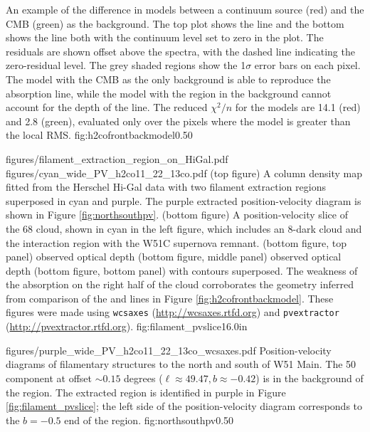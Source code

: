 {An example of the difference in models between a continuum source (red) and
the CMB (green) as the background.  The top plot shows the \oneone line and the
bottom shows the \twotwo line both with the continuum level set to zero in the
plot.  The residuals are shown
offset above the spectra, with the dashed line indicating the zero-residual
level.  The grey shaded regions show the 1$\sigma$ error bars on each pixel.
The model with the CMB as the only
background is able to reproduce the absorption line, while the model with the
\hii region in the background cannot account for the depth of the \twotwo line.
The reduced $\chi^2/n$ for the models are 14.1 (red) and 2.8 (green), evaluated
only over the pixels where the model is greater than the local RMS.}
{fig:h2cofrontbackmodel}{0.5}{0}

\FigureTwoAA
{figures/filament_extraction_region_on_HiGal.pdf}
{figures/cyan_wide_PV_h2co11_22_13co.pdf}
{(top figure) A column density map fitted from the Herschel Hi-Gal data with two
filament extraction regions superposed in cyan and purple.
The purple extracted position-velocity diagram is shown in Figure
\ref{fig:northsouthpv}.
(bottom figure) A position-velocity slice of the 68 \kms cloud, shown in cyan in the
left figure, which includes an 8\um-dark cloud and the interaction region
with the W51C supernova remnant.
(bottom figure, top panel) \formaldehyde \oneone observed optical depth
(bottom figure, middle panel) \formaldehyde \twotwo observed optical depth
(bottom figure, bottom panel)  with \formaldehyde \oneone
contours superposed.  The weakness of the \formaldehyde absorption on the right
half of the cloud corroborates the geometry inferred from comparison of the \oneone
and \twotwo lines in Figure \ref{fig:h2cofrontbackmodel}.
These figures were made using \texttt{wcsaxes} (\protect\url{http://wcsaxes.rtfd.org})
and \texttt{pvextractor} (\protect\url{http://pvextractor.rtfd.org}).
}
{fig:filament_pvslice}{1}{6.0in}


\Figure
{figures/purple_wide_PV_h2co11_22_13co_wcsaxes.pdf}
{Position-velocity diagrams of filamentary structures to the north and south of
W51 Main.  The 50 \kms component at offset $\sim0.15$ degrees
($\ell\approx49.47, b\approx-0.42$) is in the background of the \hii region.
The extracted region is identified in purple in Figure
\ref{fig:filament_pvslice}; the left side of the position-velocity diagram
corresponds to the $b=-0.5$ end of the region.}
{fig:northsouthpv}{0.5}{0}

